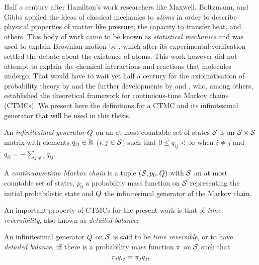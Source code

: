 Half a century after Hamilton's work
researchers like Maxwell, Boltzmann, and Gibbs %
applied the ideas of classical mechanics to \emph{atoms}
in order to describe physical properties of matter like pressure,
the capacity to transfer heat, and others.
This body of work came to be known as \emph{statistical mechanics}
and was used to explain Brownian motion by \citet{einstein-brownian},
which after its experimental verification \citep{perrin}
settled the debate about the existence of atoms.
This work however did not attempt to explain
the chemical interactions and reactions that molecules undergo.
That would have to wait yet half a century
for the axiomatisation of probability theory by \citet{kolmogorov}
and the further developments by \citet{doob} and \citet{feller},
who, among others, established the theoretical framework
for continuous-time Markov chains (CTMCs).
We present here the definitions for a CTMC
and its infinitesimal generator that will be used in this thesis.

\begin{definition}
  An \emph{infinitesimal generator} $Q$
  on an at most countable set of states $\mathcal{S}$
  is an $\mathcal{S} \times \mathcal{S}$ matrix
  with elements $q_{ij} \in \mathbb{R}$ ($i,j \in \mathcal{S}$)
  such that $0 \leqslant q_{ij} < \infty$ when $i \neq j$
  and $q_{ii} = - \sum_{j \neq i} q_{ij}$.
\end{definition}

\begin{definition}[CTMC]%
  A \emph{continuous-time Markov chain} is a tuple
  $\left(\mathcal{S}, p_0, Q\right)$ with
  $\mathcal{S}$ an at most countable set of states,
  $p_0$ a probability mass function on $\mathcal{S}$
  representing the initial probabilistic state and
  $Q$ the infinitesimal generator of the Markov chain.
\end{definition}

An important property of CTMCs for the present work is that of
\emph{time reversibility}, also known as \emph{detailed balance}:

\begin{definition}
  An infinitesimal generator $Q$ on $\mathcal{S}$ is said to be
  \emph{time reversible}, or to have \emph{detailed balance}, iff
  there is a probability mass function $\pi$ on $\mathcal{S}$ such that
  \begin{equation}
    \label{eq:detailed-balance}
    \pi_i q_{ij} = \pi_j q_{ji}
  \end{equation}
\end{definition}


